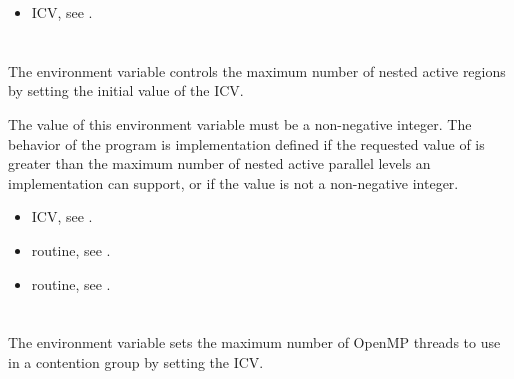 \crossreferences
\begin{itemize}
\item {} ICV, see . 
\end{itemize}










\section{}
\label{sec:OMP_MAX_ACTIVE_LEVELS}
The  environment variable controls the maximum number 
of nested active  regions by setting the initial value of the  ICV.

The value of this environment variable must be a non-negative integer. The behavior of 
the program is implementation defined if the requested value of 
 is greater than the maximum number of nested active 
parallel levels an implementation can support, or if the value is not a non-negative 
integer.

\crossreferences
\begin{itemize}
\item {} ICV, see .

\item {} routine, see .

\item {} routine, see .
\end{itemize}










\section{}
\label{sec:OMP_THREAD_LIMIT}
The  environment variable sets the maximum number of OpenMP threads to use in a contention group by setting the  ICV. 

